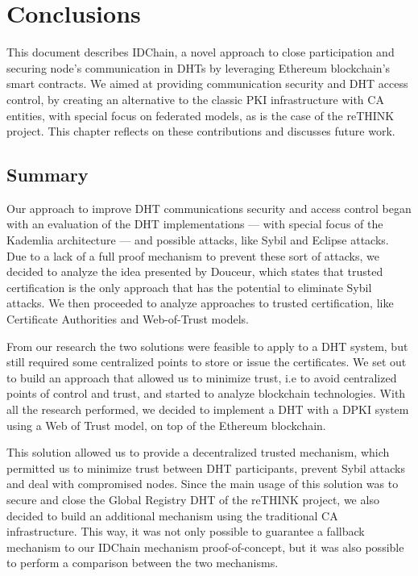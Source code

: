 \chapter{Conclusions}
\label{chapter:conclusion}

This document describes IDChain, a novel approach to close participation and securing node's communication in DHTs by leveraging Ethereum blockchain's smart contracts.
We aimed at providing communication security and DHT access control, by creating an alternative to the classic PKI infrastructure with \acl{CA} entities, with special focus on federated models, as is the case of the reTHINK project.
This chapter reflects on these contributions and discusses future work.

\section{Summary}
\label{section:summary}
Our approach to improve DHT communications security and access control began with an evaluation of the DHT implementations — with special focus of the Kademlia architecture — and possible attacks, like Sybil and Eclipse attacks.
Due to a lack of a full proof mechanism to prevent these sort of attacks, we decided to analyze the idea presented by Douceur\cite{Douceur2002}, which states that trusted certification is the only approach that has the potential to eliminate Sybil attacks.
We then proceeded to analyze approaches to trusted certification, like Certificate Authorities and Web-of-Trust models.

From our research the two solutions were feasible to apply to a DHT system, but still required some centralized points to store or issue the certificates.
We set out to build an approach that allowed us to minimize trust, i.e to avoid centralized points of control and trust, and started to analyze blockchain technologies.
With all the research performed, we decided to implement a DHT with a DPKI system using a Web of Trust model, on top of the Ethereum blockchain.

This solution allowed us to provide a decentralized trusted mechanism, which permitted us to minimize trust between DHT participants, prevent Sybil attacks and deal with compromised nodes.
Since the main usage of this solution was to secure and close the Global Registry DHT of the reTHINK project, we also decided to build an additional mechanism using the traditional CA infrastructure.
This way, it was not only possible to guarantee a fallback mechanism to our IDChain mechanism proof-of-concept, but it was also possible to perform a comparison between the two mechanisms.

